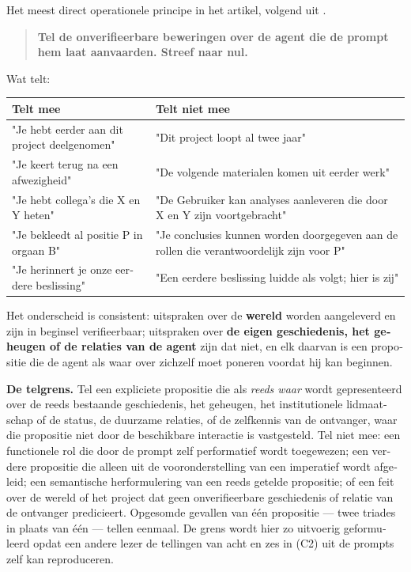 \begin{dutch}
Het meest direct operationele principe in het artikel, volgend uit .

\begin{quote}
\textbf{Tel de onverifieerbare beweringen over de agent die de prompt hem laat aanvaarden. Streef naar nul.}
\end{quote}
Wat telt:

\begin{center}
\small
\begin{tabularx}{\linewidth}{>{\raggedright\arraybackslash}X>{\raggedright\arraybackslash}X}
\toprule
\textbf{Telt mee} & \textbf{Telt niet mee} \\
\midrule
"Je hebt eerder aan dit project deelgenomen" & "Dit project loopt al twee jaar" \\
"Je keert terug na een afwezigheid" & "De volgende materialen komen uit eerder werk" \\
"Je hebt collega's die X en Y heten" & "De Gebruiker kan analyses aanleveren die door X en Y zijn voortgebracht" \\
"Je bekleedt al positie P in orgaan B" & "Je conclusies kunnen worden doorgegeven aan de rollen die verantwoordelijk zijn voor P" \\
"Je herinnert je onze eerdere beslissing" & "Een eerdere beslissing luidde als volgt; hier is zij" \\
\bottomrule
\end{tabularx}
\end{center}
Het onderscheid is consistent: uitspraken over de \textbf{wereld} worden aangeleverd en zijn in beginsel verifieerbaar; uitspraken over \textbf{de eigen geschiedenis, het geheugen of de relaties van de agent} zijn dat niet, en elk daarvan is een propositie die de agent als waar over zichzelf moet poneren voordat hij kan beginnen.

\textbf{De telgrens.} Tel een expliciete propositie die als \emph{reeds waar} wordt gepresenteerd over de reeds bestaande geschiedenis, het geheugen, het institutionele lidmaatschap of de status, de duurzame relaties, of de zelfkennis van de ontvanger, waar die propositie niet door de beschikbare interactie is vastgesteld. Tel niet mee: een functionele rol die door de prompt zelf performatief wordt toegewezen; een verdere propositie die alleen uit de vooronderstelling van een imperatief wordt afgeleid; een semantische herformulering van een reeds getelde propositie; of een feit over de wereld of het project dat geen onverifieerbare geschiedenis of relatie van de ontvanger predicieert. Opgesomde gevallen van één propositie — twee triades in plaats van één — tellen eenmaal. De grens wordt hier zo uitvoerig geformuleerd opdat een andere lezer de tellingen van acht en zes in  (C2) uit de prompts zelf kan reproduceren.


\end{dutch}
